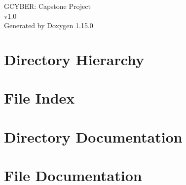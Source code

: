 \documentclass[twoside]{book}
\newcommand{\+}{\discretionary{\mbox{\scriptsize$\hookleftarrow$}}{}{}}
\newcommand{\clearemptydoublepage}{%
    \newpage{\pagestyle{empty}\cleardoublepage}%
  }
\begin{document}
  \raggedbottom
    \hypersetup{pageanchor=false,
                bookmarksnumbered=true,
                pdfencoding=unicode
               }
  \begin{titlepage}
  \vspace*{7cm}
  \begin{center}%
  {\Large GCYBER\+: Capstone Project}\\
  [1ex]\large v1.\+0 \\
  \vspace*{1cm}
  {\large Generated by Doxygen 1.15.0}\\
  \end{center}
  \end{titlepage}
  \clearemptydoublepage
  \tableofcontents
  \clearemptydoublepage
  \hypersetup{pageanchor=true}
\chapter{Directory Hierarchy}

\chapter{File Index}

\chapter{Directory Documentation}


\chapter{File Documentation}








  \backmatter
  \newpage
  \clearemptydoublepage
  \printindex
\end{document}
